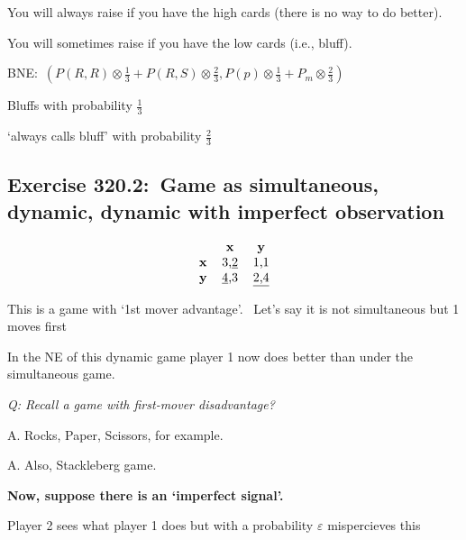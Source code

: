 \documentclass{article}
\begin{document}
You will always raise if you have the high cards (there is no way to do
better).

You will sometimes raise if you have the low cards (i.e., bluff).

\bigskip

BNE:\ $(P(R,R)\otimes \frac{1}{3}+P(R,S)\otimes \frac{2}{3},P(p)\otimes 
\frac{1}{3}+P_{m}\otimes \frac{2}{3})$

Bluffs with probability $\frac{1}{3}$

`always calls bluff' with probability $\frac{2}{3}$

\bigskip

\subsection{Exercise 320.2:\ Game as simultaneous, dynamic, dynamic with
imperfect observation}

\[
\begin{tabular}{ccc}
& \textbf{x} & \textbf{y} \\ 
\textbf{x} & 3,\underline{2} & 1,1 \\ 
\textbf{y} & \underline{4},3 & \underline{2,4}%
\end{tabular}%
\]

This is a game with `1st mover advantage'. \ Let's say it is not
simultaneous but 1 moves first


In the NE of this dynamic game player 1 now does better than under the
simultaneous game.

\newline
\textit{Q: Recall a game with first-mover disadvantage?}

\bigskip

A. Rocks, Paper, Scissors, for example.

A. Also, Stackleberg game.

\bigskip

\textbf{Now, suppose there is an `imperfect signal'. }

Player 2 sees what player 1 does but with a probability $\varepsilon $
mispercieves this

\bigskip
\end{document}
